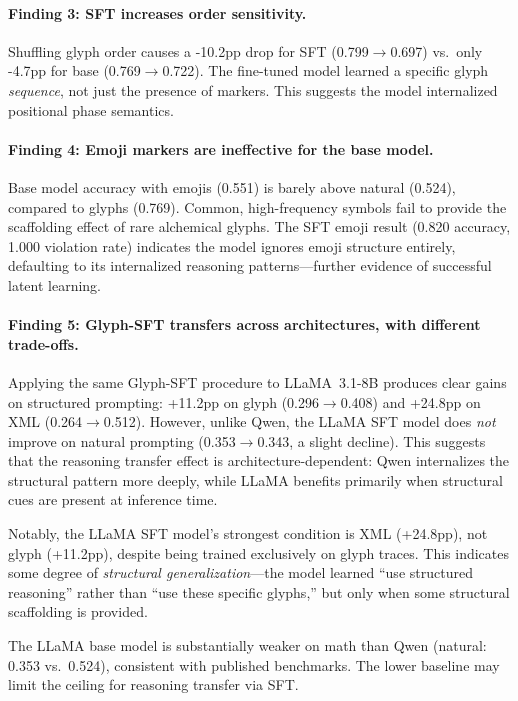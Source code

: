 \documentclass[11pt]{article}
\begin{document}
\paragraph{Finding 3: SFT increases order sensitivity.}
Shuffling glyph order causes a -10.2pp drop for SFT (0.799$\to$0.697) vs.\ only -4.7pp for base (0.769$\to$0.722). The fine-tuned model learned a specific glyph \textit{sequence}, not just the presence of markers. This suggests the model internalized positional phase semantics.

\paragraph{Finding 4: Emoji markers are ineffective for the base model.}
Base model accuracy with emojis (0.551) is barely above natural (0.524), compared to glyphs (0.769). Common, high-frequency symbols fail to provide the scaffolding effect of rare alchemical glyphs. The SFT emoji result (0.820 accuracy, 1.000 violation rate) indicates the model ignores emoji structure entirely, defaulting to its internalized reasoning patterns---further evidence of successful latent learning.

\paragraph{Finding 5: Glyph-SFT transfers across architectures, with different trade-offs.}
Applying the same Glyph-SFT procedure to LLaMA~3.1-8B produces clear gains on structured prompting: +11.2pp on glyph (0.296$\to$0.408) and +24.8pp on XML (0.264$\to$0.512). However, unlike Qwen, the LLaMA SFT model does \textit{not} improve on natural prompting (0.353$\to$0.343, a slight decline). This suggests that the reasoning transfer effect is architecture-dependent: Qwen internalizes the structural pattern more deeply, while LLaMA benefits primarily when structural cues are present at inference time.

Notably, the LLaMA SFT model's strongest condition is XML (+24.8pp), not glyph (+11.2pp), despite being trained exclusively on glyph traces. This indicates some degree of \textit{structural generalization}---the model learned ``use structured reasoning'' rather than ``use these specific glyphs,'' but only when some structural scaffolding is provided.

The LLaMA base model is substantially weaker on math than Qwen (natural: 0.353 vs.\ 0.524), consistent with published benchmarks. The lower baseline may limit the ceiling for reasoning transfer via SFT.
\end{document}

